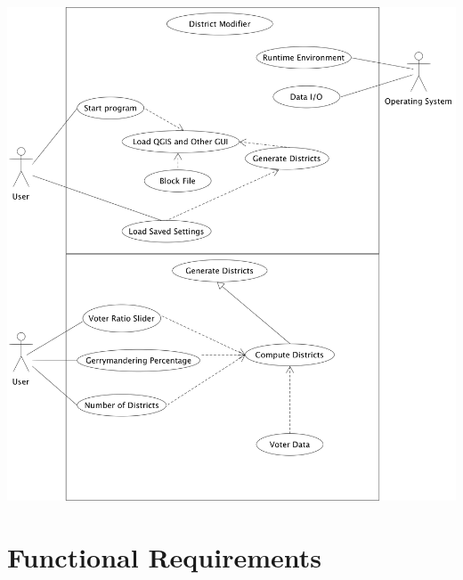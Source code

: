 \documentclass{article}
\begin{document}
\begin{center}
\hspace*{-2cm}      
\includegraphics[scale=.15]{Program.png}
\end{center}

\vspace{2.5mm}


\section{Functional Requirements}\label{sec:functionalReq}

\vspace{2.5mm}
\end{document}
